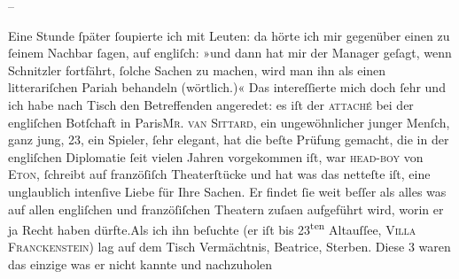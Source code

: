 \pstart
           \numberlinefalse{}\centering{}–\numberlinetrue{}\pend
           
\pstart
           Eine Stunde{ }ſpäter{ }ſoupierte ich mit Leuten: da hörte ich mir gegenüber einen  zu{ }ſeinem Nachbar{ }ſagen, auf engliſch: »und dann
               hat mir der Manager geſagt, wenn Schnitzler fortfährt, {\pb}ſolche Sachen zu machen, wird man
               ihn als einen litterariſchen Pariah behandeln (wörtlich.)« Das intereſſierte mich
               doch{ }ſehr und ich habe nach Tisch den Betreffenden angeredet: es iſt der \textsc{attaché} bei der engliſchen
                  Botſchaft in Paris\textsc{Mr. van Sittard}, ein ungewöhnlicher junger Menſch, ganz jung, 23, ein Spieler,{ }ſehr elegant,
               hat die beſte Prüfung gemacht, die in {\pb}der engliſchen Diplomatie{ }ſeit
               vielen Jahren vorgekommen iſt, war \textsc{head-boy} von \textsc{Eton},{ }ſchreibt auf franzöſiſch Theaterſtücke und hat was das netteſte iſt, eine
               unglaublich intenſive Liebe für Ihre Sachen. Er findet{ }ſie weit beſſer als alles was
               auf allen engliſchen und franzöſiſchen Theatern zuſa{\geminationm}en
               aufgeführt wird, worin er ja Recht haben dürfte.\hspace*{1.5em}Als
               ich ihn beſuchte (er {\pb}iſt bis
                     23\textsuperscript{ten}{ }Altauſſee, \textsc{Villa
                     Franckenſtein}) lag auf dem Tisch Vermächtnis, Beatrice, Sterben. Diese 3 waren das einzige was er nicht kannte und nachzuholen
